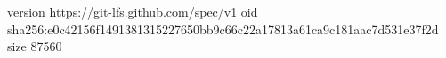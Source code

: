 version https://git-lfs.github.com/spec/v1
oid sha256:e0c42156f1491381315227650bb9c66c22a17813a61ca9c181aac7d531e37f2d
size 87560
